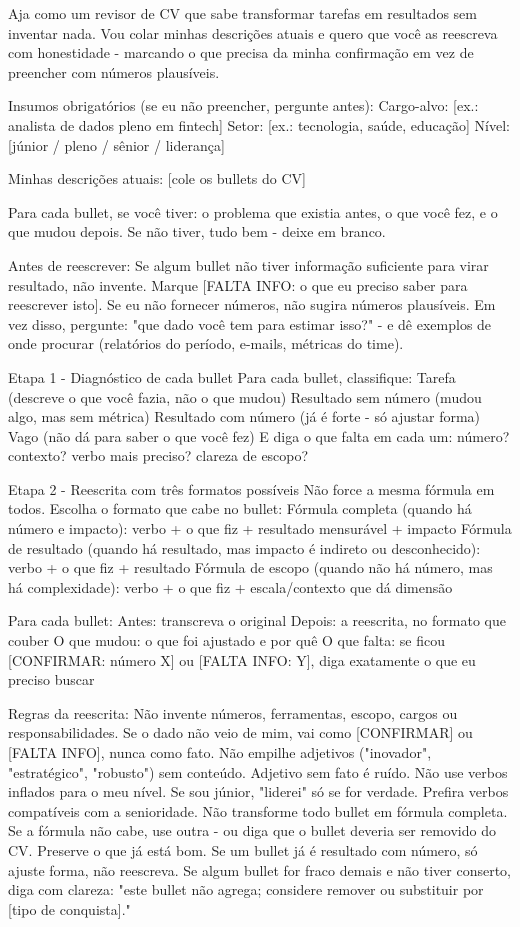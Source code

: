 \documentclass[11pt, a4paper]{article}
\begin{document}
\begin{promptbox}
Aja como um revisor de CV que sabe transformar tarefas em resultados sem inventar nada. Vou colar minhas descrições atuais e quero que você as reescreva com honestidade - marcando o que precisa da minha confirmação em vez de preencher com números plausíveis.
	
Insumos obrigatórios (se eu não preencher, pergunte antes):
 Cargo-alvo: [ex.: analista de dados pleno em fintech]
 Setor: [ex.: tecnologia, saúde, educação]
 Nível: [júnior / pleno / sênior / liderança]

Minhas descrições atuais: [cole os bullets do CV]
 
Para cada bullet, se você tiver: o problema que existia antes, o que você fez, e o que mudou depois. Se não tiver, tudo bem - deixe em branco.
	
Antes de reescrever:
 Se algum bullet não tiver informação suficiente para virar resultado, não invente. Marque [FALTA INFO: o que eu preciso saber para reescrever isto].
 Se eu não fornecer números, não sugira números plausíveis. Em vez disso, pergunte: "que dado você tem para estimar isso?" - e dê exemplos de onde procurar (relatórios do período, e-mails, métricas do time).
	
Etapa 1 - Diagnóstico de cada bullet
Para cada bullet, classifique:
 Tarefa (descreve o que você fazia, não o que mudou)
 Resultado sem número (mudou algo, mas sem métrica)
 Resultado com número (já é forte - só ajustar forma)
 Vago (não dá para saber o que você fez)
 E diga o que falta em cada um: número? contexto? verbo mais preciso? clareza de escopo?
	
Etapa 2 - Reescrita com três formatos possíveis
 Não force a mesma fórmula em todos. Escolha o formato que cabe no bullet:
 Fórmula completa (quando há número e impacto): verbo + o que fiz + resultado mensurável + impacto
 Fórmula de resultado (quando há resultado, mas impacto é indireto ou desconhecido): verbo + o que fiz + resultado
 Fórmula de escopo (quando não há número, mas há complexidade): verbo + o que fiz + escala/contexto que dá dimensão
	
Para cada bullet:
 Antes: transcreva o original
 Depois: a reescrita, no formato que couber
 O que mudou: o que foi ajustado e por quê
 O que falta: se ficou [CONFIRMAR: número X] ou [FALTA INFO: Y], diga exatamente o que eu preciso buscar
	
Regras da reescrita:
 Não invente números, ferramentas, escopo, cargos ou responsabilidades. Se o dado não veio de mim, vai como [CONFIRMAR] ou [FALTA INFO], nunca como fato.
 Não empilhe adjetivos ("inovador", "estratégico", "robusto") sem conteúdo. Adjetivo sem fato é ruído.
 Não use verbos inflados para o meu nível. Se sou júnior, "liderei" só se for verdade. Prefira verbos compatíveis com a senioridade.
 Não transforme todo bullet em fórmula completa. Se a fórmula não cabe, use outra - ou diga que o bullet deveria ser removido do CV.
 Preserve o que já está bom. Se um bullet já é resultado com número, só ajuste forma, não reescreva.
 Se algum bullet for fraco demais e não tiver conserto, diga com clareza: "este bullet não agrega; considere remover ou substituir por [tipo de conquista]."
	

\end{promptbox}
\end{document}
